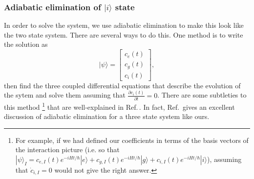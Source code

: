 \subsubsection{Adiabatic elimination of $|i\rangle$ state}
In order to solve the system, we use adiabatic elimination to make this look like the two state system. There are several ways to do this. One method is to write the solution as 
\begin{equation} 
|\psi\rangle = 
\begin{bmatrix}c_e(t)\\c_g(t)\\c_i(t)
\end{bmatrix},
\end{equation}
then find the three coupled differential equations that describe the evolution of the sytem and solve them assuming that $\frac{\partial c_i(t)}{\partial t}=0$. There are some subtleties to this method
\footnote{For example, if we had defined our coefficients in terms of the basis vectors of the interaction picture (i.e. so that 
$|\psi\rangle_I=c_{e,I}(t)e^{-iHt/\hbar}|e\rangle+c_{g,I}(t)e^{-iHt/\hbar}|g\rangle+c_{i,I}(t)e^{-iHt/\hbar}|i\rangle$), assuming that $\dot{c}_{i,I}=0$ would not give the right answer.} that are well-explained in Ref.\,\cite{brionLambdaAdiabatic}. In fact, Ref.\,\cite{brionLambdaAdiabatic} gives an excellent discussion of adiabatic elimination for a three state system like ours. 


